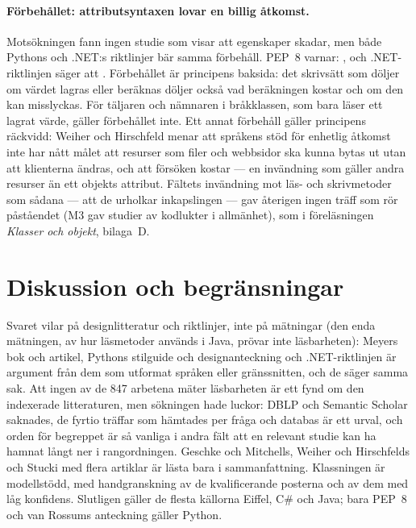 \paragraph{Förbehållet: attributsyntaxen lovar en billig åtkomst.}  Motsökningen
fann ingen studie som visar att egenskaper skadar, men både Pythons och
.NET:s riktlinjer bär samma förbehåll.  PEP~8 varnar:
, och .NET-riktlinjen säger att
.  Förbehållet är
principens baksida: det skrivsätt som döljer om värdet lagras eller
beräknas döljer också vad beräkningen kostar och om den kan misslyckas.
För täljaren och nämnaren i bråkklassen, som bara läser ett lagrat
värde, gäller förbehållet inte.  Ett annat förbehåll gäller principens räckvidd: Weiher och
Hirschfeld menar att språkens stöd för enhetlig åtkomst inte har nått
målet att resurser som filer och webbsidor ska kunna bytas ut utan att
klienterna ändras, och att försöken kostar
 --- en invändning som gäller andra resurser än ett objekts
attribut.  Fältets invändning mot läs- och
skrivmetoder som sådana --- att de urholkar inkapslingen --- gav
återigen ingen träff som rör påståendet (M3 gav studier av kodlukter i
allmänhet), som i föreläsningen \emph{Klasser och objekt}, bilaga~D.

\section{Diskussion och begränsningar}
\label{sec:egen-diskussion}

Svaret vilar på designlitteratur och riktlinjer, inte på mätningar
(den enda mätningen, av hur läsmetoder används i Java, prövar inte
läsbarheten):
Meyers bok och artikel, Pythons stilguide och designanteckning och
.NET-riktlinjen är argument från dem som utformat språken eller
gränssnitten, och de säger samma sak.  Att ingen av de 847 arbetena
mäter läsbarheten är ett fynd om den indexerade litteraturen, men
sökningen hade luckor: DBLP och Semantic Scholar saknades, de fyrtio
träffar som hämtades per fråga och databas är ett urval, och orden för
begreppet är så vanliga i andra fält att en relevant studie kan ha
hamnat långt ner i rangordningen.  Geschke och Mitchells, Weiher och Hirschfelds och Stucki med
flera artiklar är lästa bara i sammanfattning.  Klassningen är modellstödd, med
handgranskning av de kvalificerande posterna och av dem med låg
konfidens.  Slutligen gäller de flesta källorna Eiffel, C\# och Java;
bara PEP~8 och van Rossums anteckning gäller Python.

